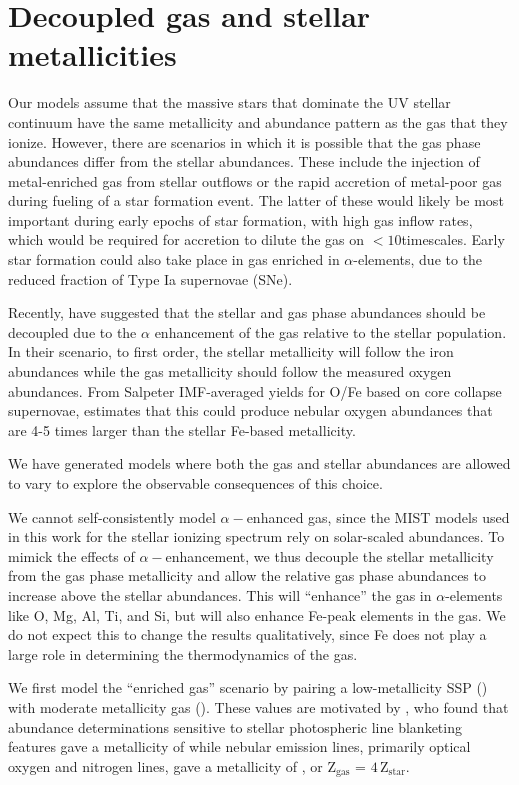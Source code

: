 \section{Decoupled gas and stellar metallicities}\label{appdx:gasZ}

Our models assume that the massive stars that dominate the UV stellar continuum have the same metallicity and abundance pattern as the gas that they ionize. However, there are scenarios in which it is possible that the gas phase abundances differ from the stellar abundances. These include the injection of metal-enriched gas from stellar outflows or the rapid accretion of metal-poor gas during fueling of a star formation event. The latter of these would likely be most important during early epochs of star formation, with high gas inflow rates, which would be required for accretion to dilute the gas on $<10$\Myr timescales. Early star formation could also take place in gas enriched in $\alpha$-elements, due to the reduced fraction of Type Ia supernovae (SNe).

Recently, \citet{Steidel+2016} have suggested that the stellar and gas phase abundances should be decoupled due to the $\alpha$ enhancement of the gas relative to the stellar population. In their scenario, to first order, the stellar metallicity will follow the iron abundances while the gas metallicity should follow the measured oxygen abundances. From Salpeter IMF-averaged yields for O/Fe based on core collapse supernovae, \citet{Steidel+2016} estimates that this could produce nebular oxygen abundances that are 4-5 times larger than the stellar Fe-based metallicity. 

We have generated models where both the gas and stellar abundances are allowed to vary to explore the observable consequences of this choice.

We cannot self-consistently model $\alpha-$enhanced gas, since the MIST models used in this work for the stellar ionizing spectrum rely on solar-scaled abundances. To mimick the effects of $\alpha-$enhancement, we thus decouple the stellar metallicity from the gas phase metallicity and allow the relative gas phase abundances to increase above the stellar abundances. This will ``enhance'' the gas in $\alpha$-elements like O, Mg, Al, Ti, and Si, but will also enhance Fe-peak elements in the gas. We do not expect this to change the results qualitatively, since Fe does not play a large role in determining the thermodynamics of the gas. 

We first model the ``enriched gas'' scenario by pairing a low-metallicity SSP () with moderate metallicity gas (). These values are motivated by \citet{Steidel+2016}, who found that abundance determinations sensitive to stellar photospheric line blanketing features gave a metallicity of  while nebular emission lines, primarily optical oxygen and nitrogen lines, gave a metallicity of , or Z$_{\mathrm{gas}}$ = $4\,$Z$_{\mathrm{star}}$.

